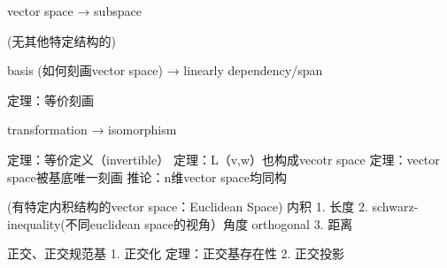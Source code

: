 vector space → subspace

(无其他特定结构的)

basis (如何刻画vector space) → linearly dependency/span

定理：等价刻画

transformation → isomorphism

定理：等价定义（invertible）
定理：L（v,w）也构成vecotr space
定理：vector space被基底唯一刻画
    推论：n维vector space均同构


(有特定内积结构的vector space：Euclidean Space)
内积
    1. 长度
    2. schwarz-inequality(不同euclidean space的视角）角度 orthogonal
    3. 距离

正交、正交规范基
    1. 正交化 定理：正交基存在性
    2. 正交投影




